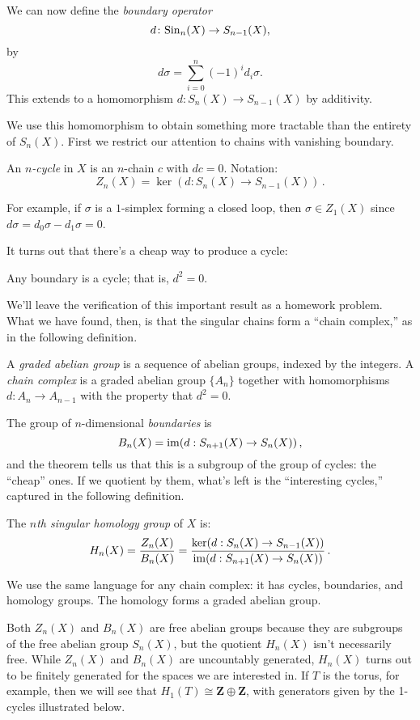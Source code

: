 We can now define the {\em boundary operator}
$$d\colon \mathrm{Sin}_n(X)\to S_{n-1}(X),$$
by
$$d\sigma = \sum_{i=0}^n(-1)^i d_i\sigma.$$
This extends to a homomorphism $d \colon S_n(X) \to S_{n-1}(X)$ by additivity.

We use this homomorphism to obtain something more tractable than the entirety of $S_n(X)$. First we restrict our attention to chains with vanishing boundary.
\begin{definition}
An \emph{$n$-cycle} in $X$ is an $n$-chain $c$ with $dc = 0$. Notation:
\[
Z_n(X) = \ker(d:S_n(X)\rightarrow S_{n-1}(X))\,.
\]
\end{definition}
For example, if $\sigma$ is a $1$-simplex forming a closed loop, then 
$\sigma\in Z_1(X)$ since $d\sigma = d_0\sigma - d_1\sigma = 0$.

It turns out that there's a cheap way to produce a cycle:
\begin{theorem}
    Any boundary is a cycle; that is, $d^2=0$.
\end{theorem}
We'll leave the verification of this important result as a homework problem. 
What we have found, then, is that the singular chains form a ``chain complex,''
as in the following definition.
\begin{definition}
A {\em graded abelian group} is a sequence of abelian groups, indexed by 
the integers. 
A {\em chain complex} is a graded abelian group $\{A_n\}$ together with 
homomorphisms $d:A_n\to A_{n-1}$ with the property that $d^2=0$.
\end{definition}

The group of $n$-dimensional {\em boundaries} is 
\[
B_n(X) = \operatorname{im}(d:S_{n+1}(X)\to S_n(X))\,,
\]
and the theorem tells us that this is a subgroup of the group of cycles: the
``cheap'' ones. If we quotient by them, what's left is the ``interesting 
cycles,'' captured in the following definition.
\begin{definition}
The \emph{$n$th singular homology group} of $X$ is:
\[
H_n(X) = \frac{Z_n(X)}{B_n(X)} = \frac{\ker(d:S_n(X)\to S_{n-1}(X))}{\operatorname{im}(d:S_{n+1}(X)\to S_n(X))}\,.
\]
\end{definition}
We use the same language for any chain complex: it has cycles, boundaries, and
homology groups. The homology forms a graded abelian group. 

Both $Z_n(X)$ and $B_n(X)$ are free abelian groups because they are subgroups of the free abelian group $S_n(X)$, but the quotient $H_n(X)$ isn't necessarily free. While $Z_n(X)$ and $B_n(X)$ are uncountably generated, $H_n(X)$ turns out to be finitely generated for the spaces we are interested in. If $T$ is the torus, for example, then we will see that $H_1(T) \cong \mathbf{Z} \oplus \mathbf{Z}$, with generators given by the 1-cycles illustrated below. 

